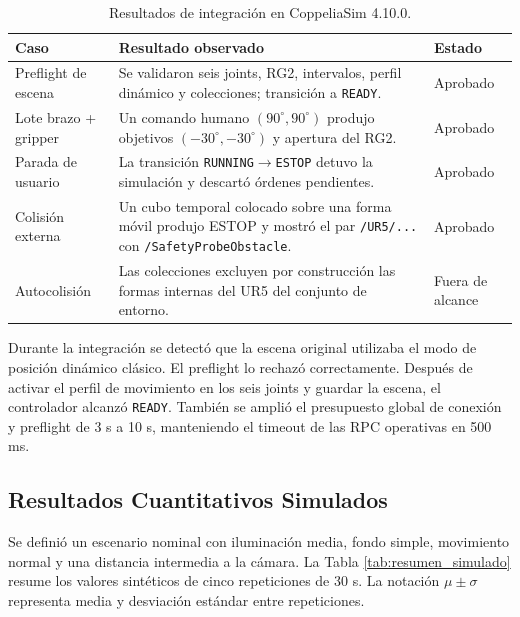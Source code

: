 \begin{table}[H]
    \centering
    \renewcommand{\arraystretch}{1.2}
    \small
    \begin{tabularx}{\textwidth}{
        >{\raggedright\arraybackslash}p{3.2cm}
        >{\raggedright\arraybackslash}X
        >{\raggedright\arraybackslash}p{2.2cm}}
        \toprule
        \textbf{Caso} & \textbf{Resultado observado} & \textbf{Estado} \\
        \midrule
        Preflight de escena &
        Se validaron seis joints, RG2, intervalos, perfil dinámico y
        colecciones; transición a \texttt{READY}. &
        Aprobado \\
        Lote brazo + gripper &
        Un comando humano $(90^\circ,90^\circ)$ produjo objetivos
        $(-30^\circ,-30^\circ)$ y apertura del RG2. &
        Aprobado \\
        Parada de usuario &
        La transición \texttt{RUNNING}$\rightarrow$\texttt{ESTOP} detuvo la
        simulación y descartó órdenes pendientes. &
        Aprobado \\
        Colisión externa &
        Un cubo temporal colocado sobre una forma móvil produjo ESTOP y mostró
        el par \texttt{/UR5/...} con \texttt{/SafetyProbeObstacle}. &
        Aprobado \\
        Autocolisión &
        Las colecciones excluyen por construcción las formas internas del UR5
        del conjunto de entorno. &
        Fuera de alcance \\
        \bottomrule
    \end{tabularx}
    \caption{Resultados de integración en CoppeliaSim 4.10.0.}
    \label{tab:resultados_integracion}
\end{table}

Durante la integración se detectó que la escena original utilizaba el modo de
posición dinámico clásico. El preflight lo rechazó correctamente. Después de
activar el perfil de movimiento en los seis joints y guardar la escena, el
controlador alcanzó \texttt{READY}. También se amplió el presupuesto global de
conexión y preflight de 3 s a 10 s, manteniendo el timeout de las RPC operativas
en 500 ms.

\subsection{Resultados Cuantitativos Simulados}
\label{subsec:resultados_simulados}

Se definió un escenario nominal con iluminación media, fondo simple, movimiento
normal y una distancia intermedia a la cámara. La Tabla
\ref{tab:resumen_simulado} resume los valores sintéticos de cinco repeticiones
de 30 s. La notación $\mu\pm\sigma$ representa media y desviación estándar entre
repeticiones.

